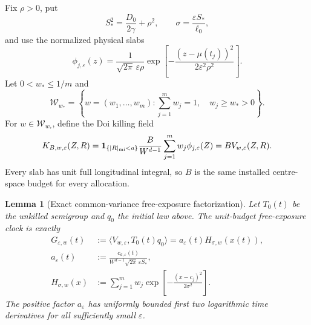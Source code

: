 \documentclass[aps,physrev,onecolumn,amsmath,amssymb,longbibliography]{revtex4-2}
\newtheorem{lemma}[theorem]{Lemma}
\begin{document}
Fix \(\rho>0\), put
\begin{equation}
 S_*^2=\frac{D_0}{2\gamma}+\rho^2,
 \qquad \sigma=\frac{\varepsilon S_*}{\ell_0},
 \label{eq:exactmfull-common-width}
\end{equation}
and use the normalized physical slabs
\begin{equation}
 \phi_{j,\varepsilon}(z)
 =\frac{1}{\sqrt{2\pi}\,\varepsilon\rho}
  \exp\!\left[-\frac{(z-\mu(t_j))^2}
  {2\varepsilon^2\rho^2}\right].
 \label{eq:exactmfull-slabs}
\end{equation}
Let \(0<w_*\le1/m\) and
\begin{equation}
 \mathcal W_{w_*}
 =\left\{w=(w_1,\ldots,w_m):
   \sum_{j=1}^m w_j=1,\quad w_j\ge w_*>0\right\}.
 \label{eq:exactmfull-weight-set}
\end{equation}
For \(w\in\mathcal W_{w_*}\), define the Doi killing field
\begin{equation}
 K_{B,w,\varepsilon}(Z,R)
 =\mathbf{1}_{\{|R|_{\rm mi}<a\}}
  \frac{B}{W^{d-1}}\sum_{j=1}^m
  w_j\phi_{j,\varepsilon}(Z)
 =B V_{w,\varepsilon}(Z,R).
 \label{eq:exactmfull-killing}
\end{equation}
Every slab has unit full longitudinal integral, so \(B\) is the same
installed centre-space budget for every allocation.

\begin{lemma}[Exact common-variance free-exposure factorization]
\label{lem:exactmfull-factorization}
Let \(T_0(t)\) be the unkilled semigroup and \(q_0\) the initial law above.
The unit-budget free-exposure clock is exactly
\begin{align}
 G_{\varepsilon,w}(t)
 &:=\langle V_{w,\varepsilon},T_0(t)q_0\rangle
 =a_\varepsilon(t)H_{\sigma,w}(x(t)),
 \label{eq:exactmfull-factorization}\\
 a_\varepsilon(t)
 &:=\frac{c_{d,\varepsilon}(t)}
 {W^{d-1}\sqrt{2\pi}\,\varepsilon S_*},
 \label{eq:exactmfull-slow-factor}\\
 H_{\sigma,w}(x)
 &:=\sum_{j=1}^m w_j
 \exp\!\left[-\frac{(x-c_j)^2}{2\sigma^2}\right].
 \label{eq:exactmfull-mixture}
\end{align}
The positive factor \(a_\varepsilon\) has uniformly bounded first two
logarithmic time derivatives for all sufficiently small \(\varepsilon\).
\end{lemma}
\end{document}
